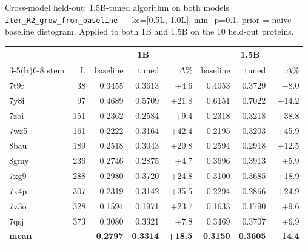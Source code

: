 \documentclass[aspectratio=169,11pt]{beamer}
\newcommand{\codeS}[1]{\texttt{\scriptsize\color{navy}#1}}
\begin{document}
\begin{frame}{Cross-model held-out: 1.5B-tuned algorithm on both models}
  \scriptsize \codeS{iter\_R2\_grow\_from\_baseline} — kc=[0.5L, 1.0L], min\_p=0.1,
  prior = naive-baseline distogram. Applied to both 1B and 1.5B on the
  10 held-out proteins.
  \vspace{0.2em}
  \begin{center}\scriptsize
    \begin{tabular}{lrrr@{\hspace{0.6em}}r@{\hspace{1.2em}}rr@{\hspace{0.6em}}r}
      \toprule
       &  & \multicolumn{3}{c}{\textbf{1B}} & \multicolumn{3}{c}{\textbf{1.5B}}\\
      \cmidrule(lr){3-5}\cmidrule(lr){6-8}
      stem & L & baseline & tuned & $\Delta$\% & baseline & tuned & $\Delta$\%\\
      \midrule
      7t9r &  38 & 0.3455 & 0.3613 & +4.6 & 0.4053 & 0.3729 & $-$8.0 \\
      7y8i &  97 & 0.4689 & 0.5709 & +21.8 & 0.6151 & 0.7022 & +14.2 \\
      7zoi & 151 & 0.2362 & 0.2584 & +9.4 & 0.2318 & 0.3218 & +38.8 \\
      7wz5 & 161 & 0.2222 & 0.3164 & +42.4 & 0.2195 & 0.3203 & +45.9 \\
      8bau & 189 & 0.2518 & 0.3043 & +20.8 & 0.2594 & 0.2918 & +12.5 \\
      8gmy & 236 & 0.2746 & 0.2875 & +4.7 & 0.3696 & 0.3913 & +5.9 \\
      7xg9 & 288 & 0.2980 & 0.3720 & +24.8 & 0.3100 & 0.3685 & +18.9 \\
      7x4p & 307 & 0.2319 & 0.3142 & +35.5 & 0.2294 & 0.2866 & +24.9 \\
      7v3o & 328 & 0.1594 & 0.1971 & +23.7 & 0.1633 & 0.1790 & +9.6 \\
      7qsj & 373 & 0.3080 & 0.3321 & +7.8 & 0.3469 & 0.3707 & +6.9 \\
      \midrule
      \textbf{mean} & & \textbf{0.2797} & \textbf{0.3314} & \textbf{+18.5} & \textbf{0.3150} & \textbf{0.3605} & \textbf{+14.4} \\
      \bottomrule
    \end{tabular}
  \end{center}
  \vspace{0.3em}
  \begin{itemize}\footnotesize
    \setlength\itemsep{0.1em}

\end{itemize}
\end{frame}
\end{document}
